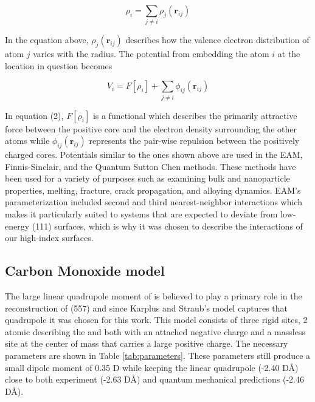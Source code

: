 \begin{equation}
\rho_{i} = \sum_{j \ne i}\rho_{j}(\mathbf{r}_{ij})
\end{equation}

In the equation above, $\rho_{j}(\mathbf{r}_{ij})$ describes how the valence
electron distribution of atom $j$ varies with the radius.  The potential from
embedding the atom $i$ at the location in question becomes

\begin{equation}
V_{i} = F[\rho_{i}] + \sum_{j \ne i} \phi_{ij}(\mathbf{r}_{ij})
\end{equation}

In equation (2), $F[\rho_{i}]$ is a functional which describes the primarily
attractive force between the positive core and the electron density surrounding
the other atoms while $\phi_{ij}(\mathbf{r}_{ij})$ represents the pair-wise
repulsion between the positively charged cores.  Potentials similar to the ones
shown above are used in the EAM, Finnis-Sinclair, and the Quantum Sutton Chen
methods.  These methods have been used for a variety of purposes such as
examining bulk and nanoparticle properties, \citep{Chui:2003fk, Wang:2005qy,
Medasani:2007uq, Mishin:1999ew} melting,\citep{Belonoshko:2000jk,
Sankaranarayanan:2006ye, Sankaranarayanan:2005bh} fracture,
\citep{Shastry:1996qg, Shastry:1998dx, Mishin:2001qt} crack propagation,
\citep{Becquart:1993sr} and alloying dynamics.  \citep{Shibata:2002hh,
Mishin:2002if, Zope:2003ai, Mishin:2005vc} EAM's parameterization included
second and third nearest-neighbor interactions which makes it particularly
suited to systems that are expected to deviate from low-energy (111) surfaces,
which is why it was chosen to describe the  interactions of
our high-index surfaces.  \citep{Foiles:1986ky} 

\subsection{Carbon Monoxide model}
The large linear quadrupole moment of  is believed to play a primary
role in the reconstruction of  (557)\citep{Tao:2010aa, Michalka:2013aa}
and since Karplus and Straub's model captures that quadrupole it was chosen for
this work.\citep{Straub:1991no} This model consists of three rigid sites, 2
atomic describing the  and  both with an attached negative charge
and a massless site at the center of mass that carries a large positive charge.
The necessary parameters are shown in Table \ref{tab:parameters}.  These
parameters still produce a small dipole moment of 0.35 D while keeping the
linear quadrupole (-2.40 D\AA) close to both experiment (-2.63 D\AA)
\citep{Chetty:2011dp} and quantum mechanical predictions (-2.46 D\AA).
\citep{Rizzo:2000sp}

